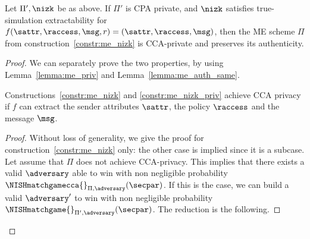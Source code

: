 \begin{theorem}\label{theo:me_nizk_priv}
    Let $\Pi', \nizk$ be as above.
    If $\Pi'$ is CPA private, and $\nizk$ satisfies true-simulation extractability for $f(\sattr, \raccess, \msg, r) = (\sattr, \raccess, \msg)$, then the ME scheme $\Pi$ from construction~\ref{constr:me_nizk} is CCA-private and preserves its authenticity.
\end{theorem}

\begin{proof}
    We can separately prove the two properties, by using Lemma~\ref{lemma:me_priv} and Lemma~\ref{lemma:me_auth_same}.

    \begin{lemma}\label{lemma:me_priv}
        Constructions~\ref{constr:me_nizk} and \ref{constr:me_nizk_priv}  achieve CCA privacy if $f$ can extract the sender attributes $\sattr$, the policy $\raccess$ and the message $\msg$.
        \begin{proof}
            Without loss of generality, we give the proof for construction~\ref{constr:me_nizk} only: the other case is implied since it is a subcase.
            Let assume that $\Pi$ does not achieve CCA-privacy. This implies that there exists a valid $\adversary$ able to win with non negligible probability $\NISHmatchgamecca{}_{\Pi, \adversary}(\secpar)$. If this is the case, we can build a valid $\adversary'$ to win with non negligible probability $\NISHmatchgame{}_{\Pi', \adversary}(\secpar)$. The reduction is the following.


\end{proof}
\end{lemma}
\end{proof}
